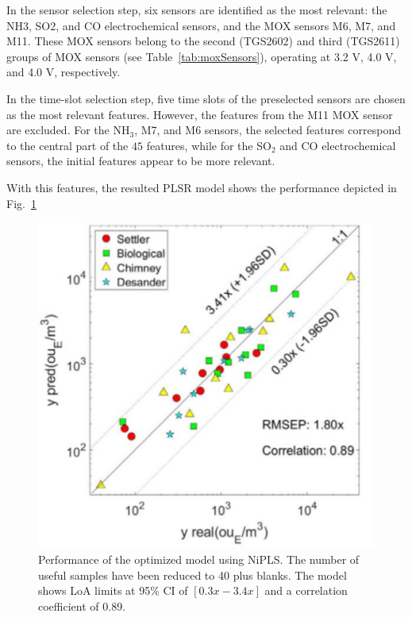 \documentclass[final,3p,times,twocolumn]{elsarticle}
\begin{document}
In the sensor selection step, six sensors are identified as the most relevant: the NH${3}$, SO${2}$, and CO electrochemical sensors, and the MOX sensors M6, M7, and M11. These MOX sensors belong to the second (TGS2602) and third (TGS2611) groups of MOX sensors (see Table~\ref{tab:moxSensors}), operating at 3.2 V, 4.0 V, and 4.0 V, respectively.

In the time-slot selection step, five time slots of the preselected sensors are chosen as the most relevant features. However, the features from the M11 MOX sensor are excluded. For the NH$_{3}$, M7, and M6 sensors, the selected features correspond to the central part of the $45$ features, while for the SO$_{2}$ and CO electrochemical sensors, the initial features appear to be more relevant.

With this features, the resulted PLSR model shows the performance depicted in Fig.~\ref{fig:NiPLSperformance}

\begin{figure}[ht!]
    \centering
    \includegraphics[width=1\linewidth]{fig9.pdf}
    \caption{Performance of the optimized model using NiPLS. The number of useful samples have been reduced to 40 plus blanks. The model shows LoA limits at 95\% CI of $[0.3x-3.4x]$ and a correlation coefficient of 0.89.}
    \label{fig:NiPLSperformance}
\end{figure}
\end{document}
